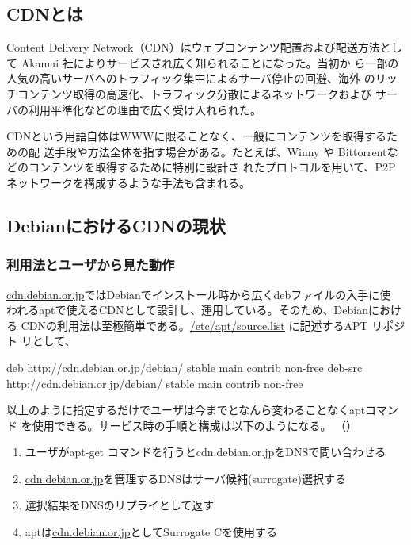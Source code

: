 \documentclass[mingoth,a4paper]{jsarticle}
\begin{document}
\label{sec:cdndebianorjp}

\subsection{CDNとは}

Content Delivery Network（CDN）はウェブコンテンツ配置および配送方法として
Akamai 社によりサービスされ広く知られることになった。当初か
ら一部の人気の高いサーバへのトラフィック集中によるサーバ停止の回避、海外
のリッチコンテンツ取得の高速化、トラフィック分散によるネットワークおよび
サーバの利用平準化などの理由で広く受け入れられた。

CDNという用語自体はWWWに限ることなく、一般にコンテンツを取得するための配
送手段や方法全体を指す場合がある。たとえば、Winny や
Bittorrentなどのコンテンツを取得するために特別に設計さ
れたプロトコルを用いて、P2Pネットワークを構成するような手法も含まれる。

\subsection{DebianにおけるCDNの現状}
\subsubsection{利用法とユーザから見た動作}

\url{cdn.debian.or.jp}ではDebianでインストール時から広くdebファイルの入手に使
われるaptで使えるCDNとして設計し、運用している。そのため、Debianにおける
CDNの利用法は至極簡単である。\url{/etc/apt/source.list} に記述するAPT リポジト
リとして、

\begin{commandline}
 deb http://cdn.debian.or.jp/debian/ stable main contrib non-free
 deb-src http://cdn.debian.or.jp/debian/ stable main contrib non-free
\end{commandline}

以上のように指定するだけでユーザは今までとなんら変わることなくaptコマンド
を使用できる。サービス時の手順と構成は以下のようになる。
（）

\begin{enumerate}
 \item  ユーザがapt-get コマンドを行うとcdn.debian.or.jpをDNSで問い合わせる
 \item  \url{cdn.debian.or.jp}を管理するDNSはサーバ候補(surrogate)選択する
 \item  選択結果をDNSのリプライとして返す
 \item  aptは\url{cdn.debian.or.jp}としてSurrogate Cを使用する
\end{enumerate}
\end{document}

